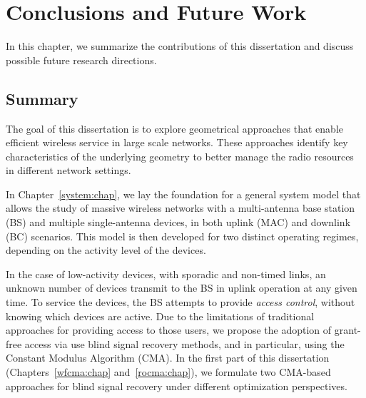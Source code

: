 \chapter{Conclusions and Future Work}\label{conclusions:chap}

In this chapter, we summarize the contributions of this dissertation and discuss possible future research directions. 

\section{Summary}
The goal of this dissertation is to explore geometrical approaches that enable efficient wireless service in large scale networks. These approaches identify key characteristics of the underlying geometry to better manage the radio resources in different network settings.
%



In Chapter~\ref{system:chap}, we lay the foundation for a general system model that allows the study of massive wireless networks with a multi-antenna base station (BS) and multiple single-antenna devices, in both uplink (MAC) and downlink (BC) scenarios. This model is then developed for two distinct operating regimes, depending on the activity level of the devices. 

In the case of low-activity devices, with sporadic and non-timed links, an unknown number of devices transmit to the BS in uplink operation at any given time. To service the devices, the BS attempts to provide \emph{access control}, without knowing which devices are active.
Due to the limitations of traditional approaches for providing access to those users, we propose the adoption of grant-free access via use blind signal recovery methods, and in particular, using the Constant Modulus Algorithm (CMA). In the first part of this dissertation (Chapters~\ref{wfcma:chap} and~\ref{rocma:chap}), we formulate two CMA-based approaches for blind signal recovery under different optimization perspectives.

